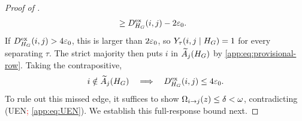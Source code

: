\begin{proof}[Proof of \AppLowDegreeScreenRef]
\begin{align*}
 &\ge D^{\mathrm{ex}}_{H_{G}}(i,j)-2\varepsilon_0.
\end{align*}
If $D^{\mathrm{ex}}_{H_{G}}(i,j)>4\varepsilon_0$, this is larger than
$2\varepsilon_0$, so $Y_{\tau}(i,j\mid H_{G})=1$ for every separating $\tau$.
The strict majority then puts $i$ in $\widetilde A_{j}(H_{G})$ by
\eqref{app:eq:provisional-row}.
Taking the contrapositive,
\begin{equation}
 i\notin\widetilde A_{j}(H_{G})
 \quad\Longrightarrow\quad
 D^{\mathrm{ex}}_{H_{G}}(i,j)\le4\varepsilon_0.
 \label{app:eq:missed-queried-diameter}
\end{equation}
To rule out this missed edge, it suffices to show
$\Omega_{i\to j}(z)\le\delta<\omega$,
contradicting (UEN\textcolor{red}{; \cref{app:eq:UEN}}).  We establish this full-response bound next.


\end{proof}
